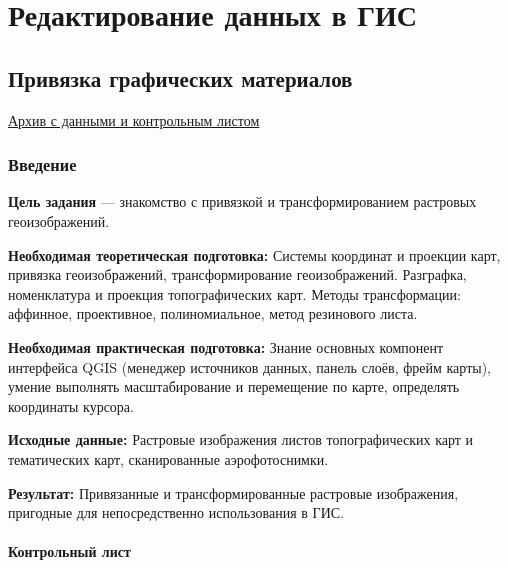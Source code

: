 \documentclass[
  12pt,
]{book}
\begin{document}
\hypertarget{part-ux440ux435ux434ux430ux43aux442ux438ux440ux43eux432ux430ux43dux438ux435-ux434ux430ux43dux43dux44bux445-ux432-ux433ux438ux441}{%
\part{Редактирование данных в ГИС}\label{part-ux440ux435ux434ux430ux43aux442ux438ux440ux43eux432ux430ux43dux438ux435-ux434ux430ux43dux43dux44bux445-ux432-ux433ux438ux441}}

\hypertarget{raster-reference}{%
\chapter{Привязка графических материалов}\label{raster-reference}}

\href{https://1drv.ms/u/s!AmtmZDq3JgxHgZspcmBD8H6C5-eloQ?e=9Dz4C6}{Архив с данными и контрольным листом}

\hypertarget{raster-reference-intro}{%
\section{Введение}\label{raster-reference-intro}}

\textbf{Цель задания} --- знакомство с привязкой и трансформированием растровых геоизображений.

\textbf{Необходимая теоретическая подготовка:} Системы координат и проекции карт, привязка геоизображений, трансформирование геоизображений. Разграфка, номенклатура и проекция топографических карт. Методы трансформации: аффинное, проективное, полиномиальное, метод резинового листа.

\textbf{Необходимая практическая подготовка:} Знание основных компонент интерфейса QGIS (менеджер источников данных, панель слоёв, фрейм карты), умение выполнять масштабирование и перемещение по карте, определять координаты курсора.

\textbf{Исходные данные:} Растровые изображения листов топографических карт и тематических карт, сканированные аэрофотоснимки.

\textbf{Результат:} Привязанные и трансформированные растровые изображения, пригодные для непосредственно использования в ГИС.

\hypertarget{raster-reference-control}{%
\subsection{Контрольный лист}\label{raster-reference-control}}
\end{document}
